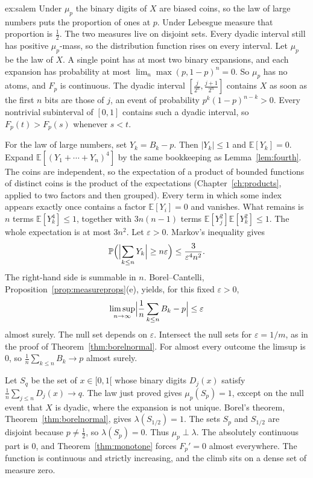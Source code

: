 \begin{solution}{ex:salem}
\idea Under $\mu_p$ the binary digits of $X$ are biased coins, so the law of large numbers puts the proportion of ones at $p$. Under Lebesgue measure that proportion is $\frac12$. The two measures live on disjoint sets. Every dyadic interval still has positive $\mu_p$-mass, so the distribution function rises on every interval.
\writeup Let $\mu_p$ be the law of $X$. A single point has at most two binary expansions, and each expansion has probability at most $\lim_n\max(p,1-p)^n=0$. So $\mu_p$ has no atoms, and $F_p$ is continuous. The dyadic interval $[\frac{j}{2^n},\frac{j+1}{2^n}]$ contains $X$ as soon as the first $n$ bits are those of $j$, an event of probability $p^k(1-p)^{n-k}>0$. Every nontrivial subinterval of $[0,1]$ contains such a dyadic interval, so $F_p(t)>F_p(s)$ whenever $s<t$.

For the law of large numbers, set $Y_k=B_k-p$. Then $|Y_k|\le1$ and $\mathbb E[Y_k]=0$. Expand $\mathbb E[(Y_1+\cdots+Y_n)^4]$ by the same bookkeeping as Lemma~\ref{lem:fourth}. The coins are independent, so the expectation of a product of bounded functions of distinct coins is the product of the expectations (Chapter~\ref{ch:products}, applied to two factors and then grouped). Every term in which some index appears exactly once contains a factor $\mathbb E[Y_i]=0$ and vanishes. What remains is $n$ terms $\mathbb E[Y_k^4]\le1$, together with $3n(n-1)$ terms $\mathbb E[Y_j^2]\mathbb E[Y_k^2]\le1$. The whole expectation is at most $3n^2$. Let $\varepsilon>0$. Markov's inequality gives
\[
\mathbb P\Bigl(\Bigl|\sum_{k\le n}Y_k\Bigr|\ge n\varepsilon\Bigr)\le\frac{3}{\varepsilon^4n^2}.
\]
The right-hand side is summable in $n$. Borel--Cantelli, Proposition~\ref{prop:measureprops}(e), yields, for this fixed $\varepsilon>0$,
\[
\limsup_{n\to\infty}\Bigl|\frac1n\sum_{k\le n}B_k-p\Bigr|\le\varepsilon
\]
almost surely. The null set depends on $\varepsilon$. Intersect the null sets for $\varepsilon=1/m$, as in the proof of Theorem~\ref{thm:borelnormal}. For almost every outcome the limsup is $0$, so $\frac1n\sum_{k\le n}B_k\to p$ almost surely.

Let $S_q$ be the set of $x\in[0,1[$ whose binary digits $D_j(x)$ satisfy $\frac1n\sum_{j\le n}D_j(x)\to q$. The law just proved gives $\mu_p(S_p)=1$, except on the null event that $X$ is dyadic, where the expansion is not unique. Borel's theorem, Theorem~\ref{thm:borelnormal}, gives $\lambda(S_{1/2})=1$. The sets $S_p$ and $S_{1/2}$ are disjoint because $p\ne\frac12$, so $\lambda(S_p)=0$. Thus $\mu_p\perp\lambda$. The absolutely continuous part is $0$, and Theorem~\ref{thm:monotone} forces $F_p'=0$ almost everywhere. The function is continuous and strictly increasing, and the climb sits on a dense set of measure zero.
\end{solution}

